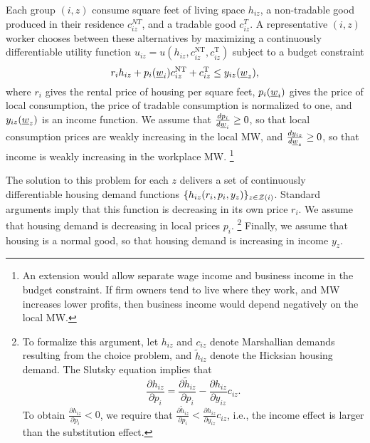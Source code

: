 Each group $(i,z)$ consume
square feet of living space $h_{iz}$, 
a non-tradable good produced in their residence $c_{iz}^{NT}$, and
a tradable good $c_{iz}^T$.
A representative $(i,z)$ worker chooses between these alternatives by maximizing
a continuously differentiable utility function 
$u_{iz} = u \left(h_{iz}, c^{\text{NT}}_{iz}, c^{\text{T}}_{iz}\right)$
subject to a budget constraint
$$r_i h_{iz} + p_i(\underline{w}_i) c^{\text{NT}}_{iz} + c^{\text{T}}_{iz} \leq y_{iz}(\underline{w}_z),$$
where
$r_i$ gives the rental price of housing per square feet,
$p_i(\underline{w}_i)$ gives the price of local consumption,
the price of tradable consumption is normalized to one, and 
$y_{iz}(\underline{w}_z)$ is an income function.
We assume that 
$\frac{d p_i}{d \underline{w}_i} \geq 0$, so that local consumption prices are weakly 
increasing in the local MW, and
$\frac{d y_{iz}}{d \underline{w}_z} \geq 0$, so that income is weakly increasing in the 
workplace MW.%
\footnote{An extension would allow separate wage income and business income in 
the budget constraint.
If firm owners tend to live where they work, and MW increases lower profits,
then business income would depend negatively on the local MW.}

The solution to this problem for each $z$ delivers a set of continuously 
differentiable housing demand functions $\{h_{iz} (r_i, p_i, y_z)\}_{z\in\mathcal{Z}(i)}$.
Standard arguments imply that this function is decreasing in its own price $r_i$.
We assume that housing demand is decreasing in local prices $p_i$.%
\footnote{To formalize this argument, let $h_{iz}$ and $c_{iz}$ denote 
Marshallian demands resulting from the choice problem, and $\tilde h_{iz}$ 
denote the Hicksian housing demand.
The Slutsky equation implies that
$$\frac{\partial h_{iz}}{\partial p_i} 
   = \frac{\partial \tilde h_{iz}}{\partial p_i} 
   - \frac{\partial h_{iz}}{\partial y_{iz}} c_{iz}.$$
To obtain $\frac{\partial h_{iz}}{\partial p_i} < 0$, we require that 
$\frac{\partial \tilde h_{iz}}{\partial p_i} 
< \frac{\partial h_{iz}}{\partial y_{iz}} c_{iz}$, i.e., the income effect is 
larger than the substitution effect.}
Finally, we assume that housing is a normal good, so that housing demand is 
increasing in income $y_z$.

